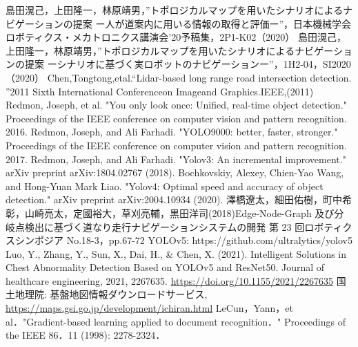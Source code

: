 \documentclass[../main]{subfiles}
\begin{document}
\begin{thebibliography}{99}
 島田滉己，上田隆一，林原靖男，”トポロジカルマップを用いたシナリオによるナビゲーションの提案 ー人が道案内に用いる情報の取得と評価ー”，日本機械学会ロボティクス・メカトロニクス講演会'20予稿集，2P1-K02（2020）
 島田滉己，上田隆一，林原靖男，”トポロジカルマップを用いたシナリオによるナビゲーションの提案 ーシナリオに基づく実ロボットのナビゲーションー”，1H2-04，SI2020（2020）
 Chen,Tongtong,etal.“Lidar-based long range road intersection detection. ”2011 Sixth International Conferenceon Imageand Graphics.IEEE,(2011)
 Redmon, Joseph, et al. "You only look once: Unified, real-time object detection." Proceedings of the IEEE conference on computer vision and pattern recognition. 2016.
 Redmon, Joseph, and Ali Farhadi. "YOLO9000: better, faster, stronger." Proceedings of the IEEE conference on computer vision and pattern recognition. 2017.
 Redmon, Joseph, and Ali Farhadi. "Yolov3: An incremental improvement." arXiv preprint arXiv:1804.02767 (2018).
 Bochkovskiy, Alexey, Chien-Yao Wang, and Hong-Yuan Mark Liao. "Yolov4: Optimal speed and accuracy of object detection." arXiv preprint arXiv:2004.10934 (2020).
 澤橋遼太，細田佑樹，町中希彰，山崎亮太，定國裕大，草刈亮輔，黒田洋司(2018)Edge-Node-Graph 及び分岐点検出に基づく道なり走行ナビゲーションシステムの開発 第 23 回ロボティクスシンポジア No.18-3，pp.67-72
 YOLOv5: https://github.com/ultralytics/yolov5
 Luo, Y., Zhang, Y., Sun, X., Dai, H., \& Chen, X. (2021). Intelligent Solutions in Chest Abnormality Detection Based on YOLOv5 and ResNet50. Journal of healthcare engineering, 2021, 2267635. \url{https://doi.org/10.1155/2021/2267635}
 国土地理院: 基盤地図情報ダウンロードサービス, \url{https://maps.gsi.go.jp/development/ichiran.html}
 LeCun，Yann，et al．"Gradient-based learning applied to document recognition．" Proceedings of the IEEE 86．11 (1998): 2278-2324．
\end{thebibliography}
\end{document}
